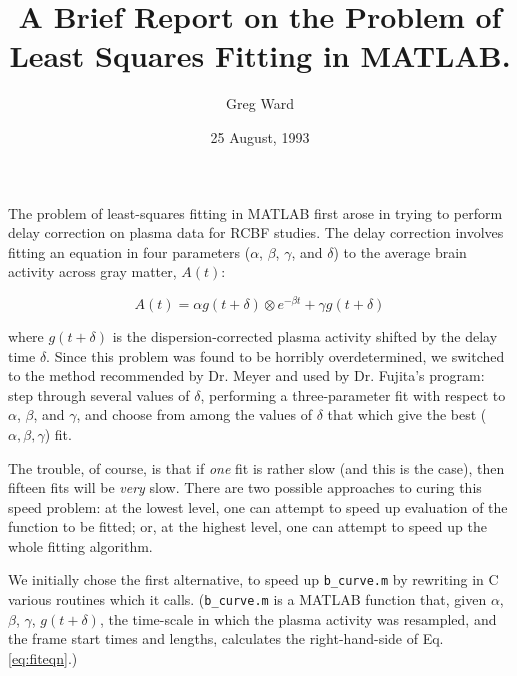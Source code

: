 
\title{A Brief Report on the Problem of Least Squares Fitting in MATLAB.}
\author{Greg Ward}
\date{25 August, 1993}



\maketitle

The problem of least-squares fitting in MATLAB first arose in trying
to perform delay correction on plasma data for RCBF studies.  The
delay correction involves fitting an equation in four parameters
($\alpha$, $\beta$, $\gamma$, and $\delta$) to the average brain
activity across gray matter, $A(t)$:

\begin{equation}
A(t) = \alpha g(t+\delta) \otimes e^{-\beta t} + \gamma g(t+\delta)
\label{eq:fiteqn}
\end{equation}

where $g(t+\delta)$ is the dispersion-corrected plasma activity
shifted by the delay time $\delta$.  Since this problem was found to
be horribly overdetermined, we switched to the method recommended by
Dr. Meyer and used by Dr. Fujita's program: step through several
values of $\delta$, performing a three-parameter fit with respect to
$\alpha$, $\beta$, and $\gamma$, and choose from among the values of
$\delta$ that which give the best ($\alpha, \beta, \gamma$) fit.

The trouble, of course, is that if {\em one} fit is rather slow (and
this is the case), then fifteen fits will be {\em very} slow.  There
are two possible approaches to curing this speed problem: at the
lowest level, one can attempt to speed up evaluation of the function
to be fitted; or, at the highest level, one can attempt to speed up
the whole fitting algorithm.

We initially chose the first alternative, to speed up \verb|b_curve.m|
by rewriting in C various routines which it calls.  (\verb|b_curve.m|
is a MATLAB function that, given $\alpha$, $\beta$, $\gamma$,
$g(t+\delta)$, the time-scale in which the plasma activity was
resampled, and the frame start times and lengths, calculates the
right-hand-side of Eq. \ref{eq:fiteqn}.)

